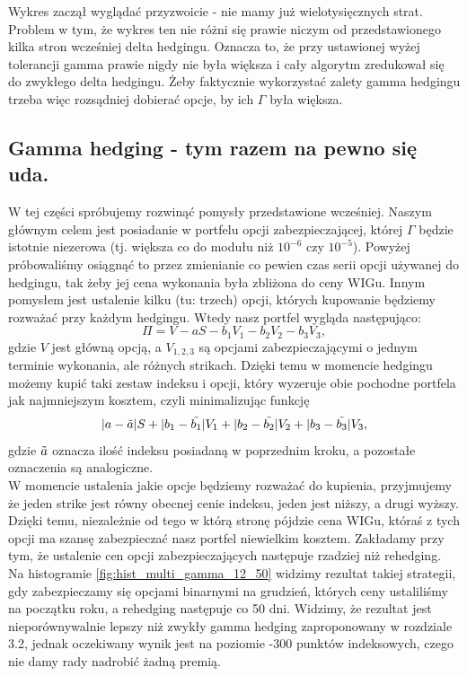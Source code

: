 \documentclass[12pt]{article}
\begin{document}
Wykres zaczął wyglądać przyzwoicie - nie mamy już wielotysięcznych strat. Problem w tym, że wykres ten nie różni się prawie niczym od przedstawionego kilka stron wcześniej delta hedgingu. Oznacza to, że przy ustawionej wyżej tolerancji gamma prawie nigdy nie była większa i cały algorytm zredukował się do zwykłego delta hedgingu. Żeby faktycznie wykorzystać zalety gamma hedgingu trzeba więc rozsądniej dobierać opcje, by ich $\Gamma$ była większa.

\subsection{Gamma hedging - tym razem na pewno się uda.}
W tej części spróbujemy rozwinąć pomysły przedstawione wcześniej. Naszym głównym celem jest posiadanie w portfelu opcji zabezpieczającej, której $\Gamma$ będzie istotnie niezerowa (tj. większa co do modułu niż $10^{-6}$ czy $10^{-5}$). Powyżej próbowaliśmy osiągnąć to przez zmienianie co pewien czas serii opcji używanej do hedgingu, tak żeby jej cena wykonania była zbliżona do ceny WIGu. Innym pomysłem jest ustalenie kilku (tu: trzech) opcji, których kupowanie będziemy rozważać przy każdym hedgingu. Wtedy nasz portfel wygląda następująco:
$$\Pi=V-aS-b_1V_1-b_2V_2-b_3V_3,$$
gdzie $V$ jest główną opcją, a $V_{1,2,3}$ są opcjami zabezpieczającymi o jednym terminie wykonania, ale różnych strikach. Dzięki temu w momencie hedgingu możemy kupić taki zestaw indeksu i opcji, który wyzeruje obie pochodne portfela jak najmniejszym kosztem, czyli minimalizując funkcję
$$|a-\Tilde{a}|S + |b_1-\Tilde{b_1}|V_1 + |b_2-\Tilde{b_2}|V_2 + |b_3-\Tilde{b_3}|V_3,$$
gdzie $\Tilde{a}$ oznacza ilość indeksu posiadaną w poprzednim kroku, a pozostałe oznaczenia są analogiczne.\\
W momencie ustalenia jakie opcje będziemy rozważać do kupienia, przyjmujemy że jeden strike jest równy obecnej cenie indeksu, jeden jest niższy, a drugi wyższy. Dzięki temu, niezależnie od tego w którą stronę pójdzie cena WIGu, któraś z tych opcji ma szansę zabezpieczać nasz portfel niewielkim kosztem. Zakładamy przy tym, że ustalenie cen opcji zabezpieczających następuje rzadziej niż rehedging.\\
Na histogramie \ref{fig:hist_multi_gamma_12_50} widzimy rezultat takiej strategii, gdy zabezpieczamy się opcjami binarnymi na grudzień, których ceny ustaliliśmy na początku roku, a rehedging następuje co 50 dni. Widzimy, że rezultat jest nieporównywalnie lepszy niż zwykły gamma hedging zaproponowany w rozdziale 3.2, jednak oczekiwany wynik jest na poziomie -300 punktów indeksowych, czego nie damy rady nadrobić żadną premią.\\
\end{document}
